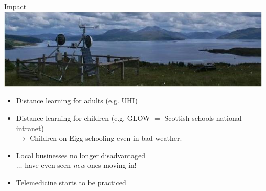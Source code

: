\documentclass{beamer}
\begin{document}
\begin{frame}{Impact}
  \includegraphics[width=\textwidth]{Ornsay.jpg}
  \begin{itemize}
    \item Distance learning for adults (e.g. UHI)
    \item Distance learning for children (e.g. GLOW $=$ Scottish
      schools national intranet)\\
      $\rightarrow$ Children on Eigg schooling even in bad weather.
    \item Local businesses no longer disadvantaged\\
      $\ldots$ have even seen \textit{new} ones moving in!
    \item Telemedicine starts to be practiced
  \end{itemize}
\end{frame}
\end{document}
